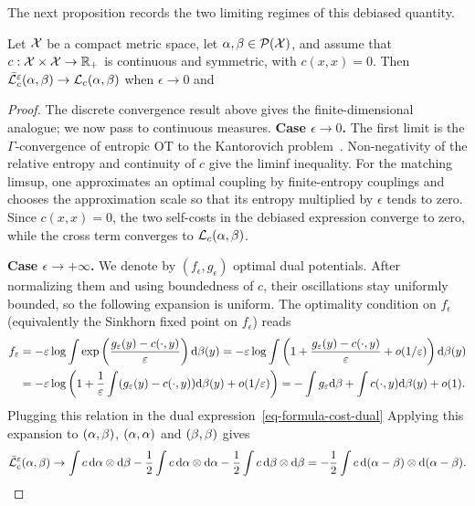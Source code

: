 The next proposition records the two limiting regimes of this debiased quantity.

\begin{prop}\label{prop-sinkhorn-divergence-asymptotics}
	Let $\mathcal{X}$ be a compact metric space, let $\alpha,\beta\in\mathcal{P}(\mathcal{X})$, and assume that $c:\mathcal{X}\times\mathcal{X}\to\mathbb{R}_+$ is continuous and symmetric, with $c(x,x)=0$.
	Then $\bar{\mathcal{L}}_c^\varepsilon(\alpha,\beta) \rightarrow \mathcal{L}_c(\alpha,\beta)$ when $\epsilon\rightarrow 0$ and
\end{prop}
\begin{proof}
	The discrete convergence result above gives the finite-dimensional analogue; we now pass to continuous measures.
	\textbf{Case $\epsilon \rightarrow 0$.}
	The first limit is the $\Gamma$-convergence of entropic OT to the Kantorovich problem~\cite{leonard2012schrodinger,2017-carlier-SIMA}. Non-negativity of the relative entropy and continuity of $c$ give the liminf inequality. For the matching limsup, one approximates an optimal coupling by finite-entropy couplings and chooses the approximation scale so that its entropy multiplied by $\epsilon$ tends to zero. Since $c(x,x)=0$, the two self-costs in the debiased expression converge to zero, while the cross term converges to $\mathcal{L}_c(\alpha,\beta)$.

	\textbf{Case $\epsilon \rightarrow +\infty$.} We denote by $(f_\epsilon,g_\epsilon)$ optimal dual potentials. After normalizing them and using boundedness of $c$, their oscillations stay uniformly bounded, so the following expansion is uniform. The optimality condition on $f_\epsilon$ (equivalently the Sinkhorn fixed point on $f_\epsilon$) reads
		\begin{align*}
			f_\varepsilon &= -\varepsilon \log \int \exp\left(  \frac{g_\varepsilon(y) - c(\cdot,y)}{\varepsilon}  \right) \mathrm{d} \beta(y)
			=	-\varepsilon \log \int \left(  1 + \frac{g_\varepsilon(y) - c(\cdot,y)}{\varepsilon} + o(1/\varepsilon)  \right) \mathrm{d} \beta(y) \\
			&=	-\varepsilon \log\left( 1+\frac{1}{\varepsilon}\int (g_\varepsilon(y)-c(\cdot,y))\mathrm{d}\beta(y)+o(1/\varepsilon) \right)
			= - \int g_\varepsilon \mathrm{d}\beta + \int c(\cdot,y) \mathrm{d} \beta(y) + o(1).
		\end{align*}
	Plugging this relation in the dual expression~\eqref{eq-formula-cost-dual}
	Applying this expansion to $(\alpha,\beta)$, $(\alpha,\alpha)$ and $(\beta,\beta)$ gives
	\[
		\bar{\mathcal{L}}_c^\varepsilon(\alpha,\beta)
		\to
		\int c\,\mathrm{d}\alpha\otimes\mathrm{d}\beta
		-\frac12\int c\,\mathrm{d}\alpha\otimes\mathrm{d}\alpha
		-\frac12\int c\,\mathrm{d}\beta\otimes\mathrm{d}\beta
		=
		-\frac12\int c\,\mathrm{d}(\alpha-\beta)\otimes\mathrm{d}(\alpha-\beta).
	\]
\end{proof}

